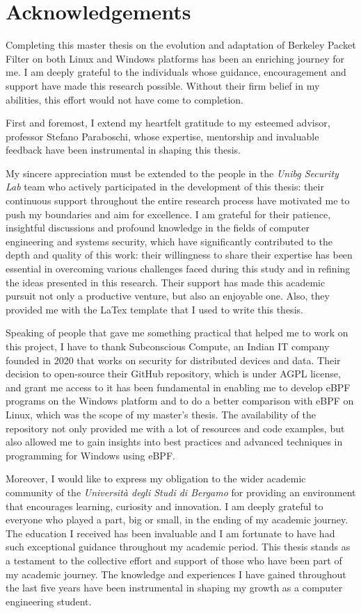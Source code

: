 \section*{Acknowledgements}

Completing this master thesis on the evolution and adaptation of Berkeley Packet Filter on both Linux and Windows platforms has been an enriching journey for me. 
I am deeply grateful to the individuals whose guidance, encouragement and support have made this research possible. 
Without their firm belief in my abilities, this effort would not have come to completion.

First and foremost, I extend my heartfelt gratitude to my esteemed advisor, professor Stefano Paraboschi, whose expertise, mentorship and invaluable feedback have been instrumental in shaping this thesis. 

My sincere appreciation must be extended to the people in the \textit{Unibg Security Lab} team who actively participated in the development of this thesis: their continuous support throughout the entire research process have motivated me to push my boundaries and aim for excellence. 
I am grateful for their patience, insightful discussions and profound knowledge in the fields of computer engineering and systems security, which have significantly contributed to the depth and quality of this work: their willingness to share their expertise has been essential in overcoming various challenges faced during this study and in refining the ideas presented in this research.
Their support has made this academic pursuit not only a productive venture, but also an enjoyable one.
Also, they provided me with the LaTex template that I used to write this thesis.

Speaking of people that gave me something practical that helped me to work on this project, I have to thank Subconscious Compute, an Indian IT company founded in 2020 that works on security for distributed devices and data.
Their decision to open-source their GitHub repository, which is under AGPL license, and grant me access to it has been fundamental in enabling me to develop eBPF programs on the Windows platform and to do a better comparison with eBPF on Linux, which was the scope of my master's thesis.
The availability of the repository not only provided me with a lot of resources and code examples, but also allowed me to gain insights into best practices and advanced techniques in programming for Windows using eBPF. 

Moreover, I would like to express my obligation to the wider academic community of the \textit{Università degli Studi di Bergamo} for providing an environment that encourages learning, curiosity and innovation. 
I am deeply grateful to everyone who played a part, big or small, in the ending of my academic journey. 
The education I received has been invaluable and I am fortunate to have had such exceptional guidance throughout my academic period. 
This thesis stands as a testament to the collective effort and support of those who have been part of my academic journey. 
The knowledge and experiences I have gained throughout the last five years have been instrumental in shaping my growth as a computer engineering student.

